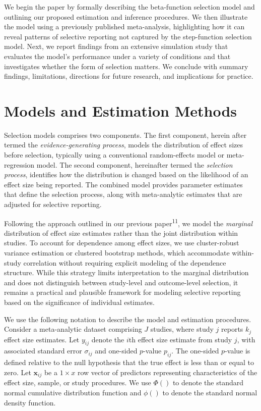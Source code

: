 \documentclass[
  american,
  man, donotrepeattitle,floatsintext]{apa7}
\begin{document}
We begin the paper by formally describing the beta-function selection model and outlining our proposed estimation and inference procedures. We then illustrate the model using a previously published meta-analysis, highlighting how it can reveal patterns of selective reporting not captured by the step-function selection model. Next, we report findings from an extensive simulation study that evaluates the model's performance under a variety of conditions and that investigates whether the form of selection matters. We conclude with summary findings, limitations, directions for future research, and implications for practice.

\section{Models and Estimation Methods}\label{model-and-estimation}

Selection models comprises two components. The first component, herein after termed the \emph{evidence-generating process}, models the distribution of effect sizes before selection, typically using a conventional random-effects model or meta-regression model. The second component, hereinafter termed the \emph{selection process}, identifies how the distribution is changed based on the likelihood of an effect size being reported. The combined model provides parameter estimates that define the selection process, along with meta-analytic estimates that are adjusted for selective reporting.

Following the approach outlined in our previous paper\textsuperscript{11}, we model the \emph{marginal} distribution of effect size estimates rather than the joint distribution within studies. To account for dependence among effect sizes, we use cluster-robust variance estimation or clustered bootstrap methods, which accommodate within-study correlation without requiring explicit modeling of the dependence structure. While this strategy limits interpretation to the marginal distribution and does not distinguish between study-level and outcome-level selection, it remains a practical and plausible framework for modeling selective reporting based on the significance of individual estimates.

We use the following notation to describe the model and estimation procedures. Consider a meta-analytic dataset comprising \(J\) studies, where study \(j\) reports \(k_j\) effect size estimates. Let \(y_{ij}\) denote the \(i\)th effect size estimate from study \(j\), with associated standard error \(\sigma_{ij}\) and one-sided \(p\)-value \(p_{ij}\). The one-sided \(p\)-value is defined relative to the null hypothesis that the true effect is less than or equal to zero. Let \(\mathbf{x}_{ij}\) be a \(1 \times x\) row vector of predictors representing characteristics of the effect size, sample, or study procedures. We use \(\Phi()\) to denote the standard normal cumulative distribution function and \(\phi()\) to denote the standard normal density function.
\end{document}
